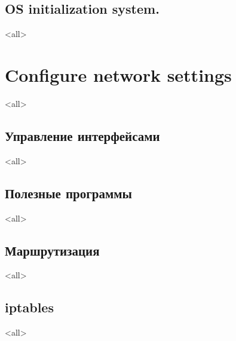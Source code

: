 \subsection{OS initialization system.}
\mode<all>{}



\section{Configure network settings}
\mode<all>{} %

\subsection{Управление интерфейсами}
\mode<all>{}

\subsection{Полезные программы}
\mode<all>{}

\subsection{Маршрутизация}
\mode<all>{}
\subsection{iptables}
\mode<all>{}


